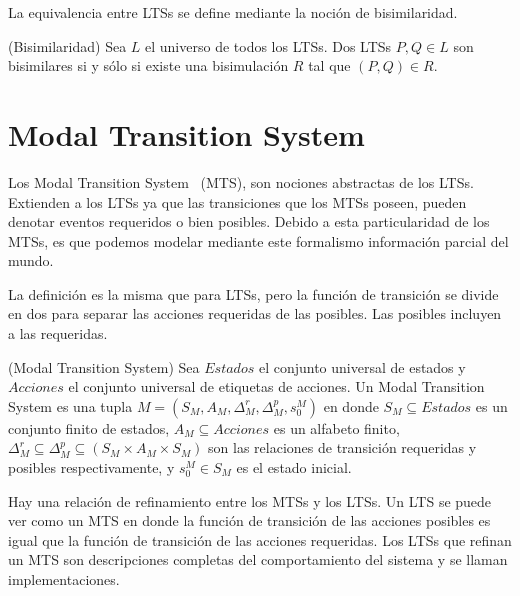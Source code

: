 La equivalencia entre LTSs se define mediante la noción de bisimilaridad.

\begin{definition}{(Bisimilaridad)}
Sea $L$ el universo de todos los LTSs. Dos LTSs $P, Q \in L$ son bisimilares si 
y sólo si existe una bisimulación $R$ tal que $(P, Q) \in R$.

\end{definition}


\section{Modal Transition System}
\label{sec:MTS}

Los Modal Transition System~\cite{MTS} (MTS), son nociones abstractas de los 
LTSs. Extienden a los LTSs ya que las transiciones 
que los MTSs poseen, pueden denotar eventos requeridos o bien posibles. Debido a esta particularidad de los MTSs, es 
que podemos modelar mediante este formalismo información parcial del mundo.

\vspace{\baselineskip}
La definición es la misma que para LTSs, pero la función de transición se divide en dos para separar las acciones 
requeridas de las posibles. Las posibles incluyen a las requeridas.

\begin{definition}{(Modal Transition System)}
Sea $Estados$ el conjunto universal de estados y $Acciones$ el conjunto universal de etiquetas de acciones. Un Modal 
Transition System es una tupla $M = (S_{M}, A_{M}, \Delta_{M}^{r}, \Delta_{M}^{p}, s_{0}^{M})$ en donde $S_{M} \subseteq Estados$ 
es un conjunto finito de estados, $A_{M} \subseteq Acciones$ es un alfabeto finito, 
$\Delta_{M}^{r} \subseteq \Delta_{M}^{p} \subseteq (S_{M} \times A_{M} \times S_{M})$ son las relaciones de transición requeridas 
y posibles respectivamente, y $s_{0}^{M} \in S_{M}$ es el estado inicial.
\end{definition}

Hay una relación de refinamiento entre los MTSs y los LTSs. Un LTS se puede ver 
como un MTS en donde la función de 
transición de las acciones posibles es igual que la función de transición de las acciones requeridas. Los LTSs que 
refinan un MTS son descripciones completas del comportamiento del sistema y se llaman implementaciones.

